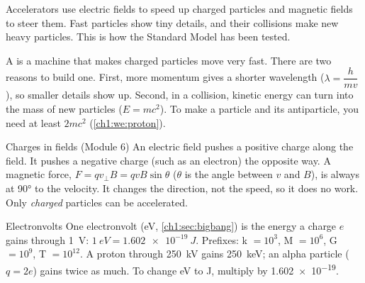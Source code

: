 \begin{bigidea}
Accelerators use electric fields to speed up charged particles and magnetic fields to
steer them. Fast particles show tiny details, and their collisions make new heavy
particles. This is how the Standard Model has been tested.
\end{bigidea}

\begin{keywords}
\end{keywords}

A  is a machine that makes charged particles move very fast.
There are two reasons to build one. First, more momentum gives a shorter wavelength
($\lambda = \dfrac{h}{mv}$), so smaller details show up. Second, in a collision, kinetic
energy can turn into the mass of new particles ($E = mc^2$). To make a particle and its
antiparticle, you need at least $2mc^2$ (\cref{ch1:we:proton}).

\begin{refresher}{Charges in fields (Module 6)}
An electric field pushes a positive charge along the field. It pushes a negative charge
(such as an electron) the opposite way. A magnetic force, $F = qv_\perp B = qvB\sin\theta$
($\theta$ is the angle between $v$ and $B$), is always at \ang{90} to the velocity. It changes the direction, not the speed, so it does
no work. Only \emph{charged} particles can be accelerated.
\end{refresher}

\begin{toolkit}{Electronvolts}
One electronvolt (\si{eV}, \cref{ch1:sec:bigbang}) is the energy a charge $e$ gains through \qty{1}{V}:
$\qty{1}{eV} = \qty{1.602e-19}{J}$. Prefixes: k $= 10^3$, M $= 10^6$, G $= 10^9$,
T $= 10^{12}$. A proton through \qty{250}{kV} gains \qty{250}{keV}; an alpha particle
($q = 2e$) gains twice as much. To change eV to J, multiply by \num{1.602e-19}.
\end{toolkit}

